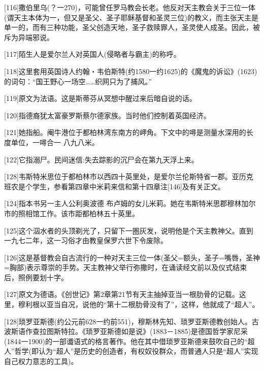 \documentclass{article}
\begin{document}
[116]撒伯里乌(？一270)，可能曾任罗马教会长老。他反对天主教会关于三位一体(谓天主本体为一，但又是圣父、圣子耶稣基督和圣灵三位)的教义，而主张天主是单一的，而有三种功能，圣父创造天地，圣子救赎罪人，圣灵使人成圣。因此，被斥为异端邪说。



[117]陌生人是爱尔兰人对英国人(侵略者与霸主)的称呼。



[118]这里套用英国诗人约翰・韦伯斯特(约1580一约1625)的《魔鬼的诉讼》(1623)的词句：“国王野心一场空……织网只为了捕风。”



[119]原文为法语。这是斯蒂芬从冥想中醒过来后暗自说的话。



[120]指德裔犹太富豪罗斯蔡尔德家族。当时他们控制着英国经济。



[121]她指船。阉牛港位于都柏林湾东南方的岬角。下文中的噚是测量水深用的长度单位，一噚合一 \cdot 八九八米。



[122]它指溺尸。民间迷信:失去踪影的沉尸会在第九天浮上来。



[128]韦斯特米思位于都柏林市以西四十英里处，是爱尔兰伦斯特省一郡。亚历克 \cdot 班农是个学生，参看第四章中米莉来信和第十四章注[146]及有关正文。



[124]指本书另一主人公利奥波德 \cdot 布卢姆的女儿米莉。她在韦斯特米思郡穆林加尔市的照相馆工作。该市距都柏林五十英里。



[125]这个泅水者的头顶剃光了，只留下一圏灰发，说明他是个天主教神父。直到一九七二年，这一习俗才由教皇保罗六世下令废除。



[126]这是基督教会自古流行的一种对天主三位一体(圣父=额头，圣子=嘴唇，圣神=胸部)表示尊崇的手势。天主教神父举行弥撒时，在诵读经文前以及仪式结束后，照例要划十字。



[127]原文为德语。《创世记》第2章第21节有天主抽掉亚当一根肋骨的记载。这里，穆利根以亚当自况，说他的“第十二根肋骨没有了”，这样，他就成了“超人”。



[128]琐罗亚斯德(约公元前628一约前551)，穆斯林先知、琐罗亚斯德教创始人。古波斯语作查拉图斯特拉。《琐罗亚斯德如是说》(1883－1885)是德国哲学家尼采(1844一1900)的一部谶语式的格言著作。他在其中借琐罗亚斯德来鼓吹自己的“超人”哲学(即认为“超人”是历史的创造者，有权奴役群众，而普通人只是“超人”实现自己权力意志的工具)。
\end{document}
